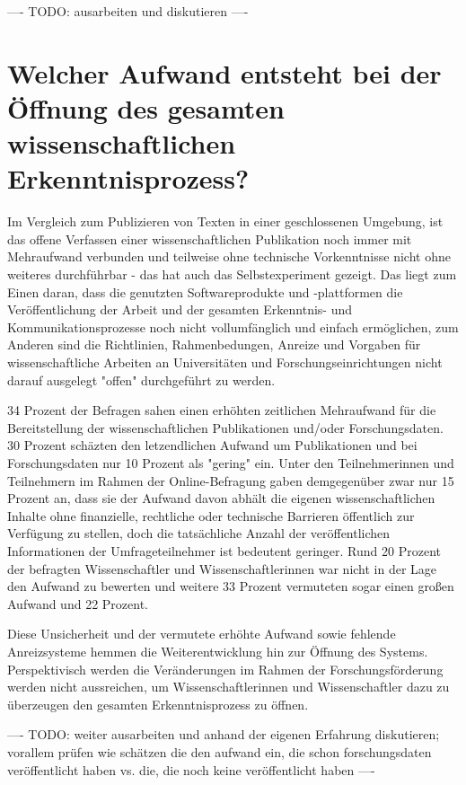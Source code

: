 ---- TODO: ausarbeiten und diskutieren ----

\section{Welcher Aufwand entsteht bei der Öffnung des gesamten wissenschaftlichen Erkenntnisprozess?}

Im Vergleich zum Publizieren von Texten in einer geschlossenen Umgebung, ist das offene Verfassen einer wissenschaftlichen Publikation noch immer mit Mehraufwand verbunden und teilweise ohne technische Vorkenntnisse nicht ohne weiteres durchführbar - das hat auch das Selbstexperiment gezeigt. Das liegt zum Einen daran, dass die genutzten Softwareprodukte und -plattformen die Veröffentlichung der Arbeit und der gesamten Erkenntnis- und Kommunikationsprozesse noch nicht vollumfänglich und einfach ermöglichen, zum Anderen sind die Richtlinien, Rahmenbedungen, Anreize und Vorgaben für wissenschaftliche Arbeiten an Universitäten und Forschungseinrichtungen nicht darauf ausgelegt "offen" durchgeführt zu werden.

34 Prozent der Befragen sahen einen erhöhten zeitlichen Mehraufwand für die Bereitstellung der wissenschaftlichen Publikationen und/oder Forschungsdaten. 30 Prozent schäzten den letzendlichen Aufwand um Publikationen und bei Forschungsdaten nur 10 Prozent als "gering" ein. Unter den Teilnehmerinnen und Teilnehmern im Rahmen der Online-Befragung gaben demgegenüber zwar nur 15 Prozent an, dass sie der Aufwand davon abhält die eigenen wissenschaftlichen Inhalte ohne finanzielle, rechtliche oder technische Barrieren öffentlich zur Verfügung zu stellen, doch die tatsächliche Anzahl der veröffentlichen Informationen der Umfrageteilnehmer ist bedeutent geringer. Rund 20 Prozent der befragten Wissenschaftler und Wissenschaftlerinnen war nicht in der Lage den Aufwand zu bewerten und weitere 33 Prozent vermuteten sogar einen großen Aufwand  und 22 Prozent.

Diese Unsicherheit und der vermutete erhöhte Aufwand sowie fehlende Anreizsysteme hemmen die Weiterentwicklung hin zur Öffnung des Systems. Perspektivisch werden die Veränderungen im Rahmen der Forschungsförderung werden nicht aussreichen, um Wissenschaftlerinnen und Wissenschaftler dazu zu überzeugen den gesamten Erkenntnisprozess zu öffnen.

---- TODO: weiter ausarbeiten und anhand der eigenen Erfahrung diskutieren; vorallem prüfen wie schätzen die den aufwand ein, die schon forschungsdaten veröffentlicht haben vs. die, die noch keine veröffentlicht haben ----
